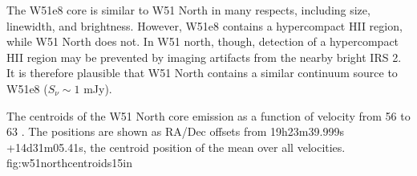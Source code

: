 The W51e8 core is similar to W51 North in many respects, including size,
linewidth, and brightness.  However, W51e8 contains a hypercompact HII region,
while W51 North does not.  In W51 north, though, detection of a hypercompact
HII region may be prevented by imaging artifacts from the nearby bright IRS 2.
It is therefore plausible that W51 North contains a similar continuum source to
W51e8 ($S_\nu \sim 1$ mJy).


{The centroids of the W51 North core \ortho \twotwo emission as a function of 
velocity from 56 to 63 \kms.  The positions are shown as RA/Dec offsets from
19h23m39.999s +14d31m05.41s, the centroid position of the mean over all
velocities.}
{fig:w51northcentroids}{1}{5in}

